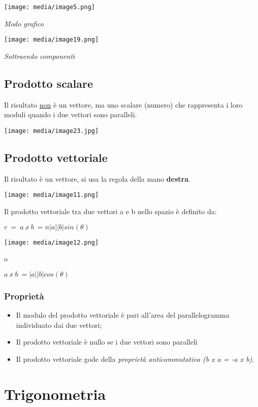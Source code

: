 \texttt{[image: media/image5.png]}

\emph{Modo grafico}

\texttt{[image: media/image19.png]}

\emph{Sottraendo componenti}

\subsection{Prodotto scalare}\label{prodotto-scalare}

Il risultato \ul{non} è un vettore, ma uno scalare (numero) che
rappresenta i loro moduli quando i due vettori sono paralleli.

\texttt{[image: media/image23.jpg]}

\subsection{Prodotto vettoriale}\label{prodotto-vettoriale}

Il risultato è un vettore, si usa la regola della mano \textbf{destra}.

\texttt{[image: media/image11.png]}

Il prodotto vettoriale tra due vettori a e b nello spazio è definito da:

\(r\  = \ a\ x\ b\  = n|a||b|sin(\theta)\)

\texttt{[image: media/image12.png]}

o

\(a\ x\ b\  = |a||b|cos(\theta)\)

\subsubsection{Proprietà}\label{proprietuxe0}

\begin{itemize}
\item
  Il modulo del prodotto vettoriale è pari all'area del parallelogramma
  individuato dai due vettori;
\item
  Il prodotto vettoriale è nullo se i due vettori sono paralleli
\item
  Il prodotto vettoriale gode della \emph{proprietà anticommutativa (b x
  a = -a x b)}.
\end{itemize}

\section{Trigonometria}\label{trigonometria}

